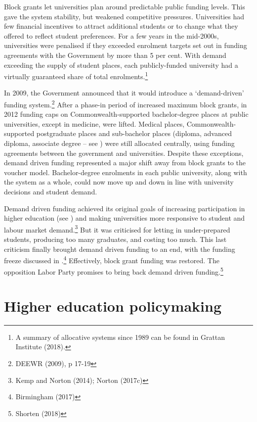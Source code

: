 \documentclass{grattan}
\begin{document}
Block grants let universities plan around predictable public funding levels. This gave the system stability, but weakened competitive pressures. Universities had few financial incentives to attract additional students or to change what they offered to reflect student preferences. For a few years in the mid-2000s, universities were penalised if they exceeded enrolment targets set out in funding agreements with the Government by more than 5 per cent. With demand exceeding the supply of student places, each publicly-funded university had a virtually guaranteed share of total enrolments.\footnote{A summary of allocative systems since 1989 can be found in Grattan Institute (2018).}

In 2009, the Government announced that it would introduce a `demand-driven' funding system.\footnote{DEEWR (2009), p 17-19} After a phase-in period of increased maximum block grants, in 2012 funding caps on Commonwealth-supported bachelor-degree places at public universities, except in medicine, were lifted. Medical places, Commonwealth-supported postgraduate places and sub-bachelor places (diploma, advanced diploma, associate degree -- see ) were still allocated centrally, using funding agreements between the government and universities. Despite these exceptions, demand driven funding represented a major shift away from block grants to the voucher model. Bachelor-degree enrolments in each public university, along with the system as a whole, could now move up and down in line with university decisions and student demand.

Demand driven funding achieved its original goals of increasing participation in higher education (see ) and making universities more responsive to student and labour market demand.\footnote{Kemp and Norton (2014); Norton (2017c)} But it was criticised for letting in under-prepared students, producing too many graduates, and costing too much. This last criticism finally brought demand driven funding to an end, with the funding freeze discussed in .\footnote{Birmingham (2017)} Effectively, block grant funding was restored. The opposition Labor Party promises to bring back demand driven funding.\footnote{Shorten (2018)}

%
\chapter{Higher education policymaking }\label{chap:higher-education-policymaking}
\end{document}
